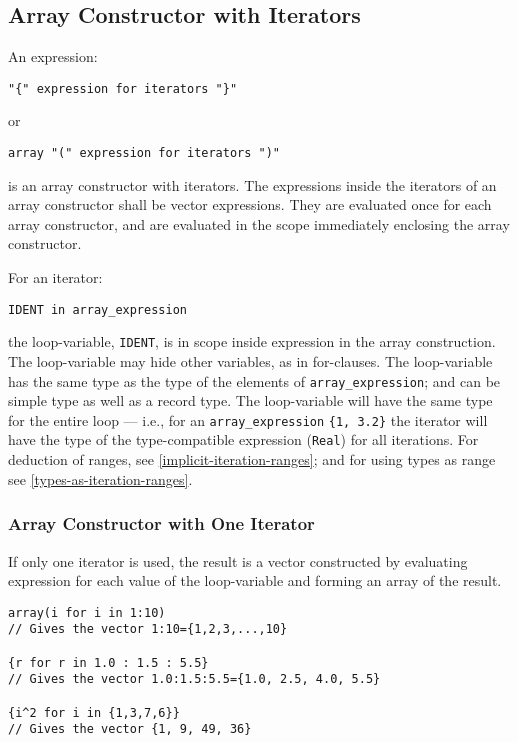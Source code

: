 \subsection{Array Constructor with Iterators}

An expression:
\begin{lstlisting}[language=grammar]
"{" expression for iterators "}"
\end{lstlisting}
or
\begin{lstlisting}[language=grammar]
array "(" expression for iterators ")"
\end{lstlisting}

is an array constructor with iterators. The expressions inside the
iterators of an array constructor shall be vector expressions. They are
evaluated once for each array constructor, and are evaluated in the
scope immediately enclosing the array constructor.

For an iterator:
\begin{lstlisting}[language=modelica]
IDENT in array_expression
\end{lstlisting}

the loop-variable, \lstinline!IDENT!, is in scope inside expression in the array construction.  The loop-variable may hide other variables, as in for-clauses.  The loop-variable has the same type as
the type of the elements of \lstinline!array_expression!; and can be simple type as well as a record type.  The loop-variable will have the same type for the entire loop --- i.e., for an
\lstinline!array_expression! \lstinline!{1, 3.2}! the iterator will have the type of the type-compatible expression (\lstinline!Real!) for all iterations.  For deduction of ranges, see
\autoref{implicit-iteration-ranges}; and for using types as range see \autoref{types-as-iteration-ranges}.

\subsubsection{Array Constructor with One Iterator}

If only one iterator is used, the result is a vector constructed by
evaluating expression for each value of the loop-variable and forming an
array of the result.

\begin{example}
\begin{lstlisting}[language=modelica]
array(i for i in 1:10)
// Gives the vector 1:10={1,2,3,...,10}

{r for r in 1.0 : 1.5 : 5.5}
// Gives the vector 1.0:1.5:5.5={1.0, 2.5, 4.0, 5.5}

{i^2 for i in {1,3,7,6}}
// Gives the vector {1, 9, 49, 36}
\end{lstlisting}
\end{example}

